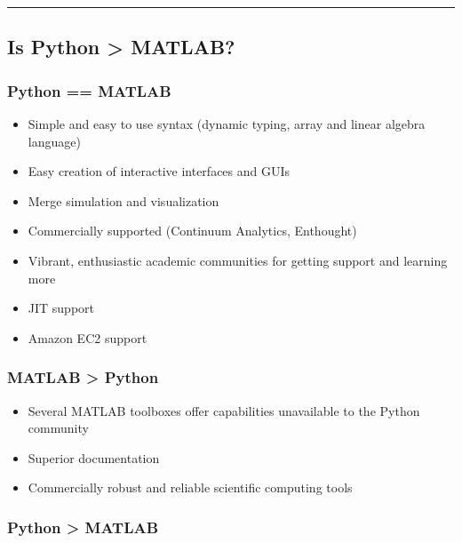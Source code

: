 \documentclass{article}
\begin{document}
    \begin{center}\rule{3in}{0.4pt}\end{center}

\subsection{Is Python \textgreater{} MATLAB?}\label{is-python-matlab}

\subsubsection{Python == MATLAB}\label{python-matlab}

\begin{itemize}
\itemsep1pt\parskip0pt
\item
  Simple and easy to use syntax (dynamic typing, array and linear
  algebra language)
\item
  Easy creation of interactive interfaces and GUIs
\item
  Merge simulation and visualization
\item
  Commercially supported (Continuum Analytics, Enthought)
\item
  Vibrant, enthusiastic academic communities for getting support and
  learning more
\item
  JIT support
\item
  Amazon EC2 support
\end{itemize}

\subsubsection{MATLAB \textgreater{} Python}\label{matlab-python}

\begin{itemize}
\itemsep1pt\parskip0pt
\item
  Several MATLAB toolboxes offer capabilities unavailable to the Python
  community
\item
  Superior documentation
\item
  Commercially robust and reliable scientific computing tools
\end{itemize}

\subsubsection{Python \textgreater{} MATLAB}\label{python-matlab-1}
\end{document}
